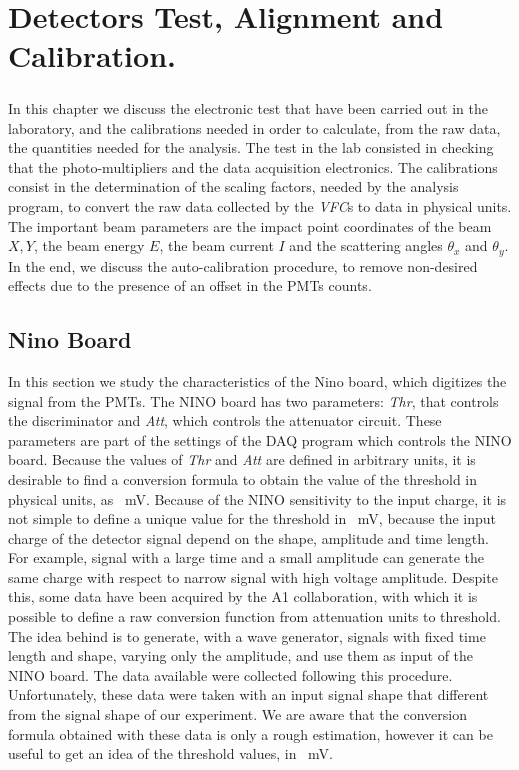 \chapter{Detectors Test, Alignment and Calibration.} \label{analysis}

\paragraph{}
In this chapter we discuss the electronic test that have been carried out in the laboratory, and the calibrations needed in order to calculate, from the raw data, the quantities needed for the analysis.
The test in the lab consisted in checking that the photo-multipliers and the data acquisition electronics.
The calibrations consist in the determination of the scaling factors, needed by the analysis program, to convert the raw data collected by the \textit{VFC}s to data in physical units. The important beam parameters are the impact point coordinates of the beam $X,Y$, the beam energy $E$, the beam current $I$ and the scattering angles $\theta_{x}$ and $\theta_{y}$. In the end, we discuss the auto-calibration procedure, to remove non-desired effects due to the presence of an offset in the PMTs counts.


\section{Nino Board}

In this section we study the characteristics of the Nino board, which digitizes the signal from the PMTs. The NINO board has two parameters: \textit{Thr}, that controls the discriminator and \textit{Att}, which controls the attenuator circuit. These parameters are part of the settings of the DAQ program which controls the NINO board.
Because the values of \textit{Thr} and \textit{Att} are defined in arbitrary units, it is desirable to find a conversion formula to obtain the value of the threshold in physical units, as \SI{}{\milli \volt}.
Because of the NINO sensitivity to the input charge, it is not simple to define a unique value for the threshold in \SI{}{\milli \volt}, because the input charge of the detector signal depend on the shape, amplitude and time length. For example, signal with a large time and a small amplitude can generate the same charge with respect to narrow signal with high voltage amplitude. Despite this, some data have been acquired by the A1 collaboration, with which it is possible to define a raw conversion function from attenuation units to threshold. The idea behind  is to generate, with a wave generator, signals with fixed time length and shape, varying only the amplitude, and use them as input of the NINO board.
The data available were collected following this procedure. Unfortunately, these data were taken with an input signal shape that different from the signal shape of our experiment. We are aware that the conversion formula obtained with these data is only a rough estimation, however it can be useful to get an idea of the threshold values, in \SI{}{\milli \volt}.

